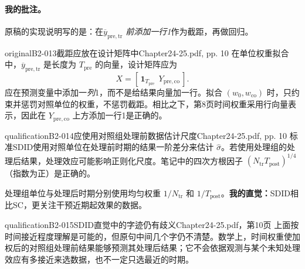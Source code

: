 \paragraph{我的批注。}
 
原稿的实现说明写的是：在\emph{\(\overline y_{\mathrm{pre,tr}}\) 前添加一行1}作为截距，再做回归。
\begin{reviewnote}{original}{B2-013}{截距应放在设计矩阵中}{Chapter24-25.pdf, pp. 10}
在单位权重拟合中，\(\overline y_{\mathrm{pre,tr}}\) 是长度为 \(T_{\mathrm{pre}}\) 的向量，设计矩阵应为
\[
X=[\,\mathbf1_{T_{\mathrm{pre}}}\ \ Y_{\mathrm{pre,co}}\,].
\]
应在预测变量中添加一\emph{列}1，而不是给结果向量加一行。拟合 \((w_0,w_{\mathrm{co}})\) 时，只约束并惩罚对照单位的权重，不惩罚截距。相比之下，第8页时间权重采用行向量表示，因此在 \(Y_{\mathrm{pre,co}}\) 上方添加一行1是正确的。
\par{}
\end{reviewnote}
\begin{reviewnote}{qualification}{B2-014}{应使用对照组处理前数据估计尺度}{Chapter24-25.pdf, pp. 10}
标准SDID使用对照单位在处理前时期的结果一阶差分来估计 \(\widehat\sigma\)。若使用处理组的处理后结果，处理效应可能影响正则化尺度。笔记中的四次方根因子 \((N_{\mathrm{tr}}T_{\mathrm{post}})^{1/4}\)（指数为正）是正确的。
\par{}
\end{reviewnote}


处理组单位与处理后时期分别使用均匀权重 \(1/N_{\mathrm{tr}}\) 和 \(1/T_{\mathrm{post}}\)。\textbf{我的直觉：}SDID相比SC，更关注干预近期起效果的数据。\begin{reviewnote}{qualification}{B2-015}{SDID直觉中的字迹仍有歧义}{Chapter24-25.pdf，第10页}
上面按时间接近程度理解是可能的，但原句中间几个字仍不清楚。数学上，时间权重使加权后的对照组处理前结果能够预测其处理后结果；它不会依据观测与某个未知处理效应有多接近来选数据，也不一定只选最近的时期。
\par{}
\end{reviewnote}


